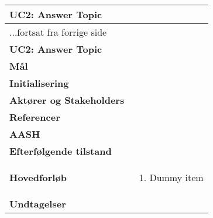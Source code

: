 \begin{center} \centering \label{ucAnswerTopic}
	\begin{longtable}{|p{4.6cm}|p{9.4cm}|}  %
		\hline
		\multicolumn{2}{|l|}{\textbf{UC2: Answer Topic}} \\\hline
		\endfirsthead
		
		\multicolumn{2}{l}{...fortsat fra forrige side} \\ \hline %
		\multicolumn{2}{|l|}{\textbf{UC2: Answer Topic}} \\\hline
		\endhead	
		
		\textbf{Mål}						&%
		\\\hline
		\textbf{Initialisering}			&%
		\\\hline
		\textbf{Aktører og Stakeholders}	&%
		\\\hline 
		\textbf{Referencer}				&%
		\\\hline
		\textbf{AASH}					&%
		\\\hline
		\textbf{Efterfølgende tilstand}	&%
		\\\hline
		\textbf{Hovedforløb}					
			&\begin{enumerate}
				
				\item Dummy item
			\end{enumerate}\\\hline
		\textbf{Undtagelser}
			&			
			\\\hline
	\end{longtable} 
\end{center}